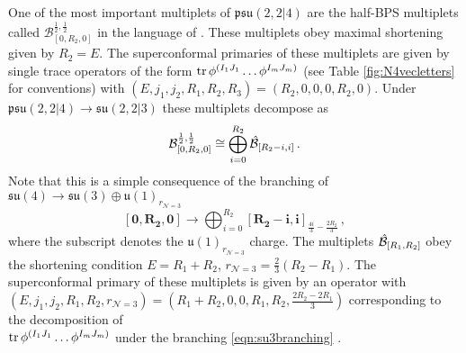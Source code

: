 \documentclass[main.tex]{subfiles}
\begin{document}
One of the most important multiplets of $\mathfrak{psu}(2,2|4)$ are the half-BPS multiplets called $\mathcal{B}_{[0,R_2,0]}^{\frac{1}{2},\frac{1}{2}}$ in the language of \cite{DolanOsborn}. These multiplets obey maximal shortening given by $R_2=E$.
The superconformal primaries of these multiplets are given by single trace operators of the form $\operatorname{tr}\phi^{(I_1J_1}\dots\phi^{I_mJ_m)}$ (see Table \ref{fig:N4vecletters} for conventions) with $(E,j_1,j_2,R_1,R_2,R_3)=(R_2,0,0,0,R_2,0)$. Under $\mathfrak{psu}(2,2|4)\to\mathfrak{su}(2,2|3)$ these multiplets decompose as
\begin{equation}\label{B0m0}
\mathcal{B}_{[0,R_2,0]}^{\frac{1}{2},\frac{1}{2}}\color{black}\cong\bigoplus_{i=0}^{R_2}\hat{\mathcal{B}}_{[R_2-i,i]}\color{black}\,.
\end{equation}
Note that this is a simple consequence of the branching of $\mathfrak{su}(4)\to\mathfrak{su}(3)\oplus\mathfrak{u}(1)_{r_{\mathcal{N}=3}}$
\begin{equation}\label{eqn:su3branching}
\mathbf{[0,R_2,0]}\to\bigoplus_{i=0}^{R_2}\mathbf{[R_2-i,i]}_{\frac{4i}{3}-\frac{2R_2}{3}}\,,
\end{equation}
where the subscript denotes the $\mathfrak{u}(1)_{r_{\mathcal{N}=3}}$ charge.
The multiplets $\hat{\mathcal{B}}_{[R_1,R_2]}\color{black}$ obey the shortening condition $E=R_1+R_2$, $r_{\mathcal{N}=3}=\frac{2}{3}(R_2-R_1)$. The superconformal primary of these multiplets is given by an operator with 
$(E,j_1,j_2,R_1,R_2,r_{\mathcal{N}=3})=\left(R_1+R_2,0,0,R_1,R_2,\frac{2R_2-2R_1}{3}\right)$ corresponding to the decomposition of \\$\operatorname{tr}\phi^{(I_1J_1}\dots\phi^{I_mJ_m)}$ under the branching \eqref{eqn:su3branching} . 
\end{document}
